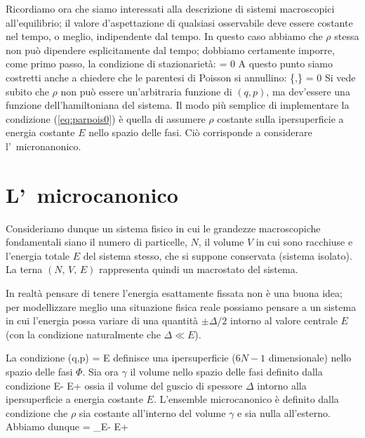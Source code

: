 Ricordiamo ora che siamo interessati alla descrizione di sistemi macroscopici all'equilibrio; il valore d'aspettazione di qualsiasi osservabile deve essere costante nel tempo, o meglio, indipendente dal tempo. In questo caso abbiamo che $\rho$ stessa non può dipendere esplicitamente dal tempo; dobbiamo certamente imporre, come primo passo, la condizione di stazionarietà:
\be
{} = 0
\ee
A questo punto siamo costretti anche a chiedere che le parentesi di Poisson si annullino:
\be
\label{eq:parpois0}
\{\rho,\Ham\} = 0
\ee
Si vede subito che $\rho$ non può essere un'arbitraria funzione di $(q,p)$, ma dev'essere una funzione dell'hamiltoniana del sistema. Il modo più semplice di implementare la condizione (\ref{eq:parpois0}) è quella di assumere $\rho$ costante sulla ipersuperficie a energia costante $E$ nello spazio delle fasi. Ciò corrisponde a considerare l'\ensemble\ micronanonico.

\section{L'\ensemble\ microcanonico}

Consideriamo dunque un sistema fisico in cui le grandezze macroscopiche fondamentali siano il numero di particelle, $N$, il volume $V$ in cui sono racchiuse e l'energia totale $E$ del sistema stesso, che si suppone conservata (sistema isolato). La terna $(N,\,V,\,E)$ rappresenta quindi un macrostato del sistema.

In realtà pensare di tenere l'energia esattamente fissata non è una buona idea; per modellizzare meglio una situazione fisica reale possiamo pensare a un sistema in cui l'energia possa variare di una quantità $\pm \Delta/2$ intorno al valore centrale $E$ (con la condizione naturalmente che $\Delta \ll E$).

La condizione
\be
\Ham(q,p) = E
\ee
definisce una ipersuperficie ($6N-1$ dimensionale) nello spazio delle fasi $\Phi$. Sia ora $\gamma$ il volume nello spazio delle fasi definito dalla condizione
\be
E- \le \Ham \le E+
\ee
ossia il volume del guscio di spessore $\Delta$ intorno alla ipersuperficie a energia costante $E$. L'ensemble microcanonico è definito dalla condizione che $\rho$ sia costante all'interno del volume $\gamma$ e sia nulla all'esterno. Abbiamo dunque
\be
\gamma = \int\limits_{E- \le \Ham \le E+}\dephi
\ee

